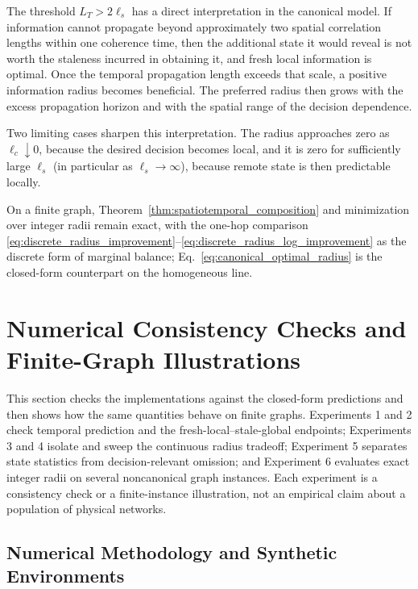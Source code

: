 \documentclass[11pt]{article}
\begin{document}
The threshold $L_T>2\ell_s$ has a direct interpretation in the canonical
model. If information cannot propagate beyond approximately two spatial
correlation lengths within one coherence time, then the additional state it
would reveal is not worth the staleness incurred in obtaining it, and fresh
local information is optimal. Once the temporal propagation length exceeds that scale,
a positive information radius becomes beneficial. The preferred radius then
grows with the excess propagation horizon and with the spatial range of the
decision dependence.

Two limiting cases sharpen this interpretation. The radius approaches zero as
$\ell_c\downarrow0$, because the desired decision becomes local, and it is zero
for sufficiently large $\ell_s$ (in particular as $\ell_s\to\infty$), because
remote state is then predictable locally.

On a finite graph, Theorem~\ref{thm:spatiotemporal_composition} and minimization
over integer radii remain exact, with the one-hop comparison
\eqref{eq:discrete_radius_improvement}--\eqref{eq:discrete_radius_log_improvement}
as the discrete form of marginal balance; Eq.~\eqref{eq:canonical_optimal_radius}
is the closed-form counterpart on the homogeneous line.





\section{Numerical Consistency Checks and Finite-Graph Illustrations}
\label{sec:numerical-evaluation}

This section checks the implementations against the closed-form predictions
and then shows how the same quantities behave on finite graphs.  Experiments 1 and 2
check temporal prediction and the fresh-local--stale-global endpoints;
Experiments 3 and 4 isolate and sweep the continuous radius tradeoff;
Experiment 5 separates state statistics from decision-relevant omission; and
Experiment 6 evaluates exact integer radii on several noncanonical graph
instances.  Each experiment is a consistency check or a finite-instance
illustration, not an empirical claim about a population of physical networks.

\subsection{Numerical Methodology and Synthetic Environments}
\label{subsec:numerical-methodology}
\end{document}
